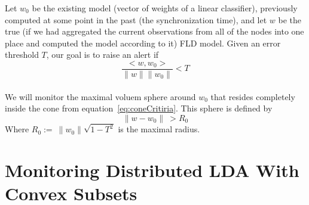\documentclass[11pt,twocolumn,varwidth=true,a4paper,fleqn]{article}
\begin{document}
Let $w_0$ be the existing model (vector of weights of a linear classifier), 
previously computed at some point in the past (the synchronization time), 
and let $w$ be the true (if we had aggregated the current observations 
from all of the nodes into one place and computed the model according to it) FLD model. 
Given an error threshold $T$, our goal is to raise an alert if
\begin{equation} \label{eq:coneCritiria}
\frac{<w,w_0>}{\parallel w \parallel \parallel w_0 \parallel}  < T
\end{equation}
\\We will monitor the maximal voluem sphere around $w_0$ that resides completely
inside the cone from equation~\ref{eq:coneCritiria}. This sphere is
defined by
\begin{equation} \label{eq:critiria}
\parallel w-w_0 \parallel \  >  R_0
\end{equation}
Where $R_0 := \  \parallel w_0 \parallel \sqrt{1-T^2}$ is the maximal radius.
\section{Monitoring Distributed LDA With Convex Subsets}
\end{document}

